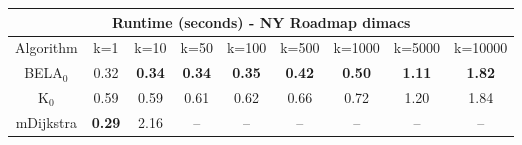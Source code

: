 \begin{tabular}{c|cccccccc}\toprule
\multicolumn{9}{c}{Runtime (seconds) - NY Roadmap dimacs}\\ \midrule
Algorithm & k=1 & k=10 & k=50 & k=100 & k=500 & k=1000 & k=5000 & k=10000 \\ \midrule
BELA$_0$ & 0.32 & \textbf{0.34} & \textbf{0.34} & \textbf{0.35} & \textbf{0.42} & \textbf{0.50} & \textbf{1.11} & \textbf{1.82} \\
K$_0$ & 0.59 & 0.59 & 0.61 & 0.62 & 0.66 & 0.72 & 1.20 & 1.84 \\
mDijkstra & \textbf{0.29} & 2.16 & -- & -- & -- & -- & -- & -- \\ \bottomrule 
\end{tabular}
